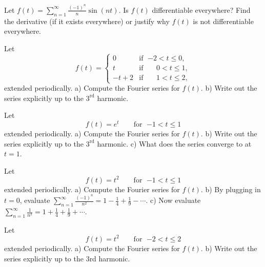 \documentclass[12pt]{book}
\begin{document}
\begin{exercise}
Let $f(t) = \sum_{n=1}^\infty \frac{{(-1)}^n}{n} \sin (n t)$.  Is $f(t)$
differentiable everywhere?  Find the derivative (if it exists everywhere) or
justify why $f(t)$ is not differentiable everywhere.
\end{exercise}

\begin{exercise}
Let
\begin{equation*}
f(t) =
\begin{cases}
0 & \text{if } \; {-2} < t \leq 0, \\
t & \text{if } \; \phantom{-}0 < t \leq 1, \\
-t+2 & \text{if } \; \phantom{-}1 < t \leq 2,
\end{cases}
\end{equation*}
extended periodically.
a) Compute the Fourier series for $f(t)$.  b) Write out the series explicitly up
to the $3^{\text{rd}}$ harmonic.
\end{exercise}

\begin{exercise}
Let
\begin{equation*}
f(t) = e^t \qquad \text{for } \; {-1} < t \leq 1
\end{equation*}
extended periodically.
a) Compute the Fourier series for $f(t)$.  b) Write out the series explicitly up
to the $3^{\text{rd}}$ harmonic. c) What does the series converge to at
$t=1$.
\end{exercise}

\begin{exercise}
Let
\begin{equation*}
f(t) = t^2 \qquad \text{for } \; {-1} < t \leq 1
\end{equation*}
extended periodically.
a) Compute the Fourier series for $f(t)$.
b) By plugging in $t=0$,
evaluate $\displaystyle \sum_{n=1}^\infty \frac{{(-1)}^n}{n^2} = 1 - \frac{1}{4} +
\frac{1}{9} - \cdots$.
c) Now evaluate $\displaystyle \sum_{n=1}^\infty \frac{1}{n^2} = 1 + \frac{1}{4} +
\frac{1}{9} + \cdots$.
\end{exercise}

\setcounter{exercise}{100}

\begin{exercise}
Let
\begin{equation*}
f(t) = t^2 \qquad \text{for } \; {-2} < t \leq 2
\end{equation*}
extended periodically. a) Compute the Fourier series for $f(t)$. b) Write out the series explicitly up to
the 3rd harmonic.
\end{exercise}
\end{document}
